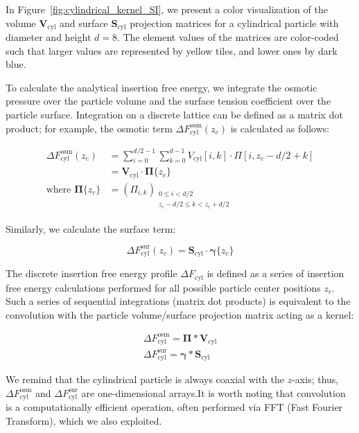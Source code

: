 \documentclass[10pt, a4paper]{article}
\begin{document}
\begin{multicols}{2}
In Figure~\ref{fig:cylindrical_kernel_SI}, we present a color visualization of the volume $\mathbf{V}_{\textrm{cyl}}$ and surface $\mathbf{S}_{\textrm{cyl}}$ projection matrices for a cylindrical particle with diameter and height $d = 8$.
The element values of the matrices are color-coded such that larger values are represented by yellow tiles, and lower ones by dark blue.

To calculate the analytical insertion free energy, we integrate the osmotic pressure over the particle volume and the surface tension coefficient over the particle surface.
Integration on a discrete lattice can be defined as a matrix dot product; for example, the osmotic term $\Delta F_{\textrm{cyl}}^{\textrm{osm}}(z_c)$ is calculated as follows:

\begin{equation}\label{eq:cyl_fe_osm}
    \begin{split}
        \Delta F_{\textrm{cyl}}^{\textrm{osm}}(z_c) &= \sum_{i=0}^{d/2 - 1} \sum_{k=0}^{d - 1} V_{\textrm{cyl}}[i, k] \cdot \Pi[i, z_c - d/2 + k] \\
        &= \mathbf{V}_{\textrm{cyl}} \cdot \boldsymbol{\Pi}\{z_c\} \\
        \text{where } \boldsymbol{\Pi}\{z_c\} &= \left( \Pi_{i, k} \right)_{\substack{0 \leq i < d/2 \\ z_c - d/2 \leq k < z_c + d/2}}
    \end{split}
\end{equation}

Similarly, we calculate the surface term:

\begin{equation}\label{eq:cyl_fe_sur}
    \Delta F_{\textrm{cyl}}^{\textrm{sur}}(z_c) = \mathbf{S}_{\textrm{cyl}} \cdot \boldsymbol{\gamma}\{z_c\}
\end{equation}

The discrete insertion free energy profile $\Delta F_{\textrm{cyl}}$ is defined as a series of insertion free energy calculations performed for all possible particle center positions $z_c$.
Such a series of sequential integrations (matrix dot products) is equivalent to the convolution with the particle volume/surface projection matrix acting as a kernel:

\begin{eqnarray}
    \Delta F_{\textrm{cyl}}^{\textrm{osm}} = \boldsymbol{\Pi} \ast \mathbf{V}_{\textrm{cyl}} \\
    \Delta F_{\textrm{cyl}}^{\textrm{sur}} = \boldsymbol{\gamma} \ast \mathbf{S}_{\textrm{cyl}}
\end{eqnarray}

We remind that the cylindrical particle is always coaxial with the $z$-axis; thus, $\Delta F_{\textrm{cyl}}^{\textrm{osm}}$ and $\Delta F_{\textrm{cyl}}^{\textrm{sur}}$ are one-dimensional arrays.It is worth noting that convolution is a computationally efficient operation, often performed via FFT (Fast Fourier Transform), which we also exploited.

\end{multicols}
\end{document}
